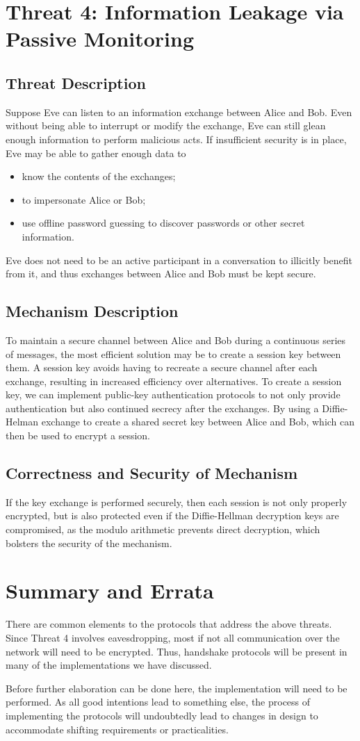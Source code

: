 \documentclass[11pt]{article}
\begin{document}
\section{Threat 4: Information Leakage via Passive Monitoring}
\subsection{Threat Description}
Suppose Eve can listen to an information exchange between Alice and Bob. Even without being able to interrupt or modify the exchange, Eve can still glean enough information to perform malicious acts. If insufficient security is in place, Eve may be able to gather enough data to
\begin{itemize}
\item know the contents of the exchanges;
\item to impersonate Alice or Bob;
\item use offline password guessing to discover passwords or other secret information.
\end{itemize}
Eve does not need to be an active participant in a conversation to illicitly benefit from it, and thus exchanges between Alice and Bob must be kept secure.
\subsection{Mechanism Description}
To maintain a secure channel between Alice and Bob during a continuous series of messages, the most efficient solution may be to create a session key between them. A session key avoids having to recreate a secure channel after each exchange, resulting in increased efficiency over alternatives. To create a session key, we can implement public-key authentication protocols to not only provide authentication but also continued secrecy after the exchanges. By using a Diffie-Helman exchange to create a shared secret key between Alice and Bob, which can then be used to encrypt a session.
\subsection{Correctness and Security of Mechanism}
If the key exchange is performed securely, then each session is not only properly encrypted, but is also protected even if the Diffie-Hellman decryption keys are compromised, as the modulo arithmetic prevents direct decryption, which bolsters the security of the mechanism.
\section{Summary and Errata}
There are common elements to the protocols that address the above threats. Since Threat 4 involves eavesdropping, most if not all communication over the network will need to be encrypted. Thus, handshake protocols will be present in many of the implementations we have discussed.

Before further elaboration can be done here, the implementation will need to be performed. As all good intentions lead to something else, the process of implementing the protocols will undoubtedly lead to changes in design to accommodate shifting requirements or practicalities.
\end{document}
